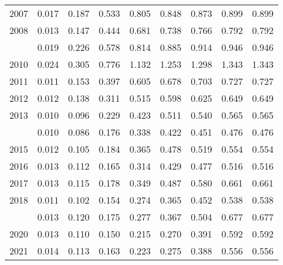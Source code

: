 \documentclass[
]{article}
\begin{document}
\begin{longtable}[t]{lrrrrrrrr}
2007 & 0.017 & 0.187 & 0.533 & 0.805 & 0.848 & 0.873 & 0.899 & 0.899\\
2008 & 0.013 & 0.147 & 0.444 & 0.681 & 0.738 & 0.766 & 0.792 & 0.792\\
\addlinespace
2009 & 0.019 & 0.226 & 0.578 & 0.814 & 0.885 & 0.914 & 0.946 & 0.946\\
2010 & 0.024 & 0.305 & 0.776 & 1.132 & 1.253 & 1.298 & 1.343 & 1.343\\
2011 & 0.011 & 0.153 & 0.397 & 0.605 & 0.678 & 0.703 & 0.727 & 0.727\\
2012 & 0.012 & 0.138 & 0.311 & 0.515 & 0.598 & 0.625 & 0.649 & 0.649\\
2013 & 0.010 & 0.096 & 0.229 & 0.423 & 0.511 & 0.540 & 0.565 & 0.565\\
\addlinespace
2014 & 0.010 & 0.086 & 0.176 & 0.338 & 0.422 & 0.451 & 0.476 & 0.476\\
2015 & 0.012 & 0.105 & 0.184 & 0.365 & 0.478 & 0.519 & 0.554 & 0.554\\
2016 & 0.013 & 0.112 & 0.165 & 0.314 & 0.429 & 0.477 & 0.516 & 0.516\\
2017 & 0.013 & 0.115 & 0.178 & 0.349 & 0.487 & 0.580 & 0.661 & 0.661\\
2018 & 0.011 & 0.102 & 0.154 & 0.274 & 0.365 & 0.452 & 0.538 & 0.538\\
\addlinespace
2019 & 0.013 & 0.120 & 0.175 & 0.277 & 0.367 & 0.504 & 0.677 & 0.677\\
2020 & 0.013 & 0.110 & 0.150 & 0.215 & 0.270 & 0.391 & 0.592 & 0.592\\
2021 & 0.014 & 0.113 & 0.163 & 0.223 & 0.275 & 0.388 & 0.556 & 0.556\\*
\end{longtable}
\end{document}
